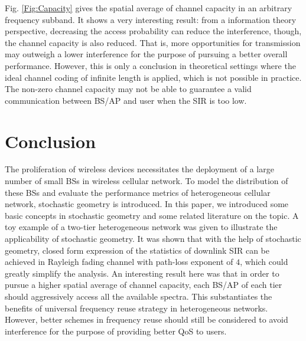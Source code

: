 \documentclass[a4paper,twocolumn]{IEEEtran}
\begin{document}
Fig. \ref{Fig:Capacity} gives the spatial average of channel capacity in an arbitrary frequency subband. It shows a very interesting result: from a information theory perspective, decreasing the access probability can reduce the interference, though, the channel capacity is also reduced. That is, more opportunities for transmission may outweigh a lower interference for the purpose of pursuing a better overall performance. However, this is only a conclusion in theoretical settings where the ideal channel coding of infinite length is applied, which is not possible in practice. The non-zero channel capacity may not be able to guarantee a valid communication between BS/AP and user when the SIR is too low.    
\section{Conclusion}\label{Sec:Con}
The proliferation of wireless devices necessitates the deployment of a large number of small BSs in wireless cellular network. To model the distribution of these BSs and evaluate the performance metrics of heterogeneous cellular network, stochastic geometry is introduced. In this paper, we introduced some basic concepts in stochastic geometry and some related literature on the topic. A toy example of a two-tier heterogeneous network was given to illustrate the applicability of stochastic geometry. It was shown that with the help of stochastic geometry, closed form expression of the statistics of downlink SIR can be achieved in Rayleigh fading channel with path-loss exponent of $4$, which could greatly simplify the analysis. An interesting result here was that in order to pursue a higher spatial average of channel capacity, each BS/AP of each tier should aggressively access all the available spectra. This substantiates the benefits of universal frequency reuse strategy in heterogeneous networks. However, better schemes in frequency reuse should still be considered to avoid interference for the purpose of providing better QoS to users.      


  
\end{document}
